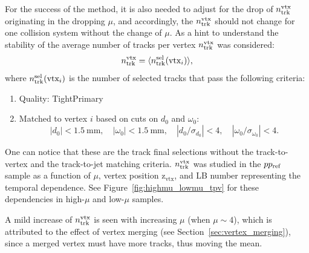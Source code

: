 For the success of the method, it is also needed to adjust for the drop of $n_\text{trk}^\text{vtx}$ originating in the dropping $\mu$, and accordingly, the $n_\text{trk}^\text{vtx}$ should not change for one collision system without the change of $\mu$. As a hint to understand the stability of the average number of tracks per vertex
$n_\text{trk}^\text{vtx}$ was considered:
\begin{equation}
  n_\text{trk}^\text{vtx} = \langle n_\text{trk}^\text{sel}(\text{vtx}_i) \rangle,
\end{equation}
where $n_\text{trk}^\text{sel}(\text{vtx}_i)$ is the number of selected tracks that pass the following criteria:
\begin{enumerate}
    \item Quality: TightPrimary 
    \item Matched to vertex $i$ based on cuts on $d_0$ and $\omega_0$:
    \begin{equation}
        |d_0| < \qty{1.5}{\mm}, \quad
        |\omega_0| < \qty{1.5}{\mm}, \quad
        |d_0/\sigma_{d_0}| < 4, \quad
        |\omega_0/\sigma_{\omega_0}| < 4.
    \end{equation}
\end{enumerate}
One can notice that these are the track final selections without the track-to-vertex and the track-to-jet matching criteria. $n_\text{trk}^\text{vtx}$ was studied in the $pp_{\mathrm{ref}}$ sample as a function of $\mu$, vertex position $\mathrm{z_{vtx}}$, and LB number representing the temporal dependence. See Figure~\ref{fig:highmu_lowmu_tpv} for these dependencies in high-$\mu$ and low-$\mu$ samples. 

A mild increase of $n_\text{trk}^\text{vtx}$ is seen with increasing $\mu$ (when $\mu \sim 4$), which is attributed to the effect of vertex merging (see Section~\ref{sec:vertex_merging}), since a merged vertex must have more tracks, thus moving the mean. 

